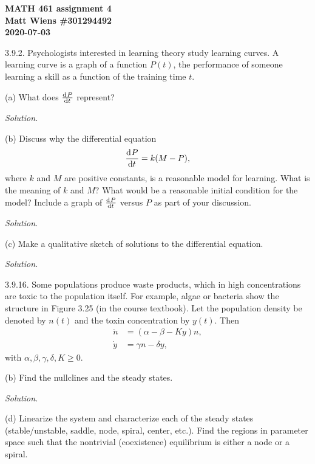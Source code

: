 \documentclass{article}
\begin{document}
\textbf{MATH 461 assignment 4} \\
\textbf{Matt Wiens \#301294492} \\
\textbf{2020-07-03}

3.9.2. Psychologists interested in learning theory study learning
curves. A learning curve is a graph of a function $P(t)$, the
performance of someone learning a skill as a function of the training
time $t$.

(a) What does $\od{P}{t}$ represent?

\textit{Solution.}

\vspace{5mm}

(b) Discuss why the differential equation
%
\begin{equation*}
    \dod{P}{t} = k (M - P),
\end{equation*}
%
where $k$ and $M$ are positive constants, is a reasonable model for
learning. What is the meaning of $k$ and $M$? What would be a reasonable
initial condition for the model? Include a graph of $\od{P}{t}$ versus
$P$ as part of your discussion.

\textit{Solution.}

\vspace{5mm}

(c) Make a qualitative sketch of solutions to the differential equation.

\textit{Solution.}

\newpage

3.9.16. Some populations produce waste products, which in high concentrations are
toxic to the population itself. For example, algae or bacteria show the structure
in Figure 3.25 (in the course textbook). Let the population density be denoted
by $n(t)$ and the toxin concentration by $y(t)$. Then
%
\begin{align*}
    \dot{n} &= (\alpha - \beta - K y) n, \\
    \dot{y} &= \gamma n - \delta y,
\end{align*}
%
with $\alpha, \beta, \gamma, \delta, K \geq 0$.

(b) Find the nullclines and the steady states.

\textit{Solution.}

\vspace{5mm}

(d) Linearize the system and characterize each of the steady states
(stable/unstable, saddle, node, spiral, center, etc.). Find the regions
in parameter space such that the nontrivial (coexistence) equilibrium is
either a node or a spiral.
\end{document}
